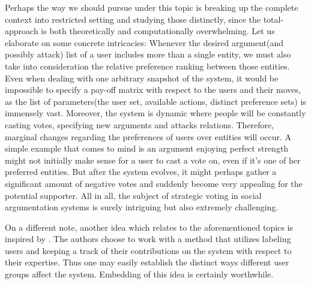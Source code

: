 \documentclass{article}
\begin{document}
{\color{red} Perhaps the way we should pursue under this topic is breaking up the complete context into restricted setting and studying those distinctly, since the total-approach is both theoretically and computationally overwhelming. Let us elaborate on some concrete intricacies: Whenever the desired argument(and possibly attack) list of a user includes more than a single entity, we must also take into consideration the relative preference ranking between those entities.} Even when dealing with one arbitrary snapshot of the system, it would be impossible to specify a pay-off matrix with respect to the users and their moves, as the list of parameters(the user set, available actions, distinct preference sets) is immensely vast. Moreover, the system is dynamic where people will be constantly casting votes, specifying new arguments and attacks relations. Therefore, marginal changes regarding the preferences of users over entities will occur. A simple example that comes to mind is an argument enjoying perfect strength might not initially make sense for a user to cast a vote on, even if it's one of her preferred entities. But after the system evolves, it might perhaps gather a significant amount of negative votes and suddenly become very appealing for the potential supporter. All in all, the subject of strategic voting in social argumentation systems is surely intriguing but also extremely challenging. 

On a different note, another idea which relates to the aforementioned topics is inspired by \cite{maudetComma}. The authors choose to work with a method that utilizes labeling users and keeping a track of their contributions on the system with respect to their expertise. Thus one may easily establish the distinct ways different user groups affect the system. Embedding of this idea is certainly worthwhile.





\end{document}
